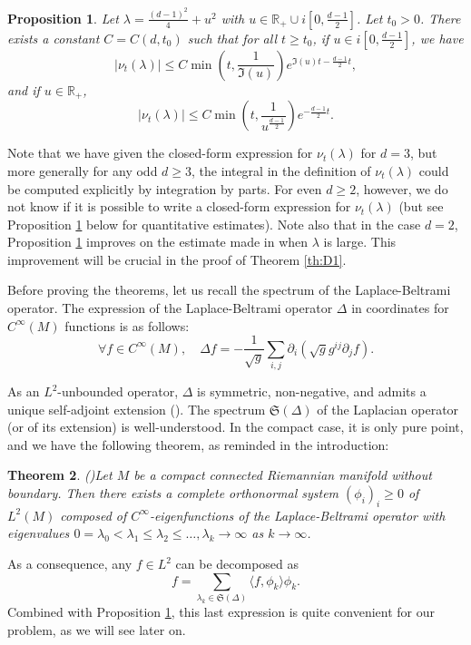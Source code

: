 \documentclass[]{scrartcl}
\newcommand{\R}{\mathds{R}}
\newtheorem{theorem}{Theorem}[section]
\newtheorem{proposition}[theorem]{Proposition}
\numberwithin{equation}{section}
\numberwithin{figure}{section}
\begin{document}
\begin{proposition}{}\label{prop:SpAt}
	Let $\lambda = \frac{(d-1)^2}{4}+u^2$ with $u \in \R_+ \cup i \left[0, \frac{d-1}{2}\right]$. Let $t_0 > 0$. There exists a constant $C = C(d,t_0)$ such that for all $t \geq t_0$, if $u \in i \left[0, \frac{d-1}{2}\right]$, we have
	$$|\nu_t(\lambda)|  \leq C  \min \left( t, \frac{1}{\Im(u)} \right)  e^{ \Im (u)  t-\frac{d-1}{2}t},$$
	and  if $u \in \R_+$,
	$$
	|\nu_t(\lambda)|  \leq C  \min \left( t, \frac{1}{u^{\frac{d-1}{2}}} \right)  e^{-\frac{d-1}{2}t}.
	$$
\end{proposition}

Note that we have given the closed-form expression for $\nu_t(\lambda)$ for $d=3$, but more generally for any odd $d \geq 3$, the integral in the definition of $\nu_t(\lambda)$ could be computed explicitly by integration by parts. For even $d \geq 2$, however, we do not know if it is possible to write a closed-form expression for $\nu_t(\lambda)$ (but see Proposition \ref{prop:SpAt} below for quantitative estimates).
Note also that in the case $d=2$, Proposition \ref{prop:SpAt} improves on the estimate made in \cite[Proposition 2.3]{Golubev} when $\lambda$ is large. This improvement will be crucial in the proof of Theorem \ref{th:D1}. 

Before proving the theorems, let us recall the spectrum of the Laplace-Beltrami operator. The expression of the Laplace-Beltrami operator $\Delta$ in coordinates for $C^\infty(M)$ functions is as follows: \[\forall f \in C^\infty(M), \quad \Delta f = - \frac{1}{\sqrt{g}}\sum_{i, j}^{}\partial_i\left(\sqrt{g}g^{ij}\partial_j f\right).\]

As an $L^2$-unbounded operator, $\Delta$ is symmetric, non-negative, and admits a unique self-adjoint extension (\cite{Stri}). The spectrum $\mathfrak S(\Delta)$ of the Laplacian operator (or of its extension) is well-understood. In the compact case, it is only pure point, and we have the following theorem, as reminded in the introduction: 
\begin{theorem}{(\cite{Chavel})}\label{th:LaplacianSpec}
Let $M$ be a compact connected Riemannian manifold without boundary. Then there exists a complete orthonormal system $(\phi_i)_i\geq 0$ of $L^2(M)$ composed of $C^\infty$-eigenfunctions of the Laplace-Beltrami operator with eigenvalues $0 = \lambda_0 < \lambda_1 \leq \lambda_2\leq \dots, \lambda_k \to \infty$ as $k\to \infty$.
\end{theorem}

	As a consequence, any $f \in L^2$ can be decomposed as \begin{equation}f = \sum_{\lambda_k \in \mathfrak S(\Delta)} \langle f, \phi_k \rangle \phi_k. \label{Dec}
	\end{equation} Combined with Proposition \ref{prop:SpAt}, this last expression is quite convenient for our problem, as we will see later on.
		
\end{document}
